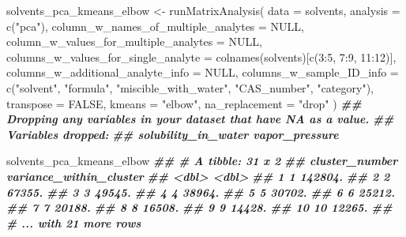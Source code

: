 \documentclass[
]{krantz}
\newenvironment{Shaded}{\begin{snugshade}}{\end{snugshade}}
\newcommand{\AttributeTok}[1]{\textcolor[rgb]{0.77,0.63,0.00}{#1}}
\newcommand{\ConstantTok}[1]{\textcolor[rgb]{0.00,0.00,0.00}{#1}}
\newcommand{\DecValTok}[1]{\textcolor[rgb]{0.00,0.00,0.81}{#1}}
\newcommand{\DocumentationTok}[1]{\textcolor[rgb]{0.56,0.35,0.01}{\textbf{\textit{#1}}}}
\newcommand{\FunctionTok}[1]{\textcolor[rgb]{0.00,0.00,0.00}{#1}}
\newcommand{\NormalTok}[1]{#1}
\newcommand{\OtherTok}[1]{\textcolor[rgb]{0.56,0.35,0.01}{#1}}
\newcommand{\SpecialCharTok}[1]{\textcolor[rgb]{0.00,0.00,0.00}{#1}}
\newcommand{\StringTok}[1]{\textcolor[rgb]{0.31,0.60,0.02}{#1}}
\begin{document}
\begin{Shaded}
\begin{Highlighting}[]
\NormalTok{solvents\_pca\_kmeans\_elbow }\OtherTok{\textless{}{-}} \FunctionTok{runMatrixAnalysis}\NormalTok{(}
  \AttributeTok{data =}\NormalTok{ solvents,}
  \AttributeTok{analysis =} \FunctionTok{c}\NormalTok{(}\StringTok{"pca"}\NormalTok{),}
  \AttributeTok{column\_w\_names\_of\_multiple\_analytes =} \ConstantTok{NULL}\NormalTok{,}
  \AttributeTok{column\_w\_values\_for\_multiple\_analytes =} \ConstantTok{NULL}\NormalTok{,}
  \AttributeTok{columns\_w\_values\_for\_single\_analyte =} \FunctionTok{colnames}\NormalTok{(solvents)[}\FunctionTok{c}\NormalTok{(}\DecValTok{3}\SpecialCharTok{:}\DecValTok{5}\NormalTok{, }\DecValTok{7}\SpecialCharTok{:}\DecValTok{9}\NormalTok{, }\DecValTok{11}\SpecialCharTok{:}\DecValTok{12}\NormalTok{)],}
  \AttributeTok{columns\_w\_additional\_analyte\_info =} \ConstantTok{NULL}\NormalTok{,}
  \AttributeTok{columns\_w\_sample\_ID\_info =} \FunctionTok{c}\NormalTok{(}\StringTok{"solvent"}\NormalTok{, }\StringTok{"formula"}\NormalTok{, }\StringTok{"miscible\_with\_water"}\NormalTok{, }\StringTok{"CAS\_number"}\NormalTok{, }\StringTok{"category"}\NormalTok{),}
  \AttributeTok{transpose =} \ConstantTok{FALSE}\NormalTok{,}
  \AttributeTok{kmeans =} \StringTok{"elbow"}\NormalTok{,}
  \AttributeTok{na\_replacement =} \StringTok{"drop"}
\NormalTok{)}
\DocumentationTok{\#\# Dropping any variables in your dataset that have NA as a value.}
\DocumentationTok{\#\# Variables dropped:}
\DocumentationTok{\#\# solubility\_in\_water vapor\_pressure}

\NormalTok{solvents\_pca\_kmeans\_elbow}
\DocumentationTok{\#\# \# A tibble: 31 x 2}
\DocumentationTok{\#\#    cluster\_number variance\_within\_cluster}
\DocumentationTok{\#\#             \textless{}dbl\textgreater{}                   \textless{}dbl\textgreater{}}
\DocumentationTok{\#\#  1              1                 142804.}
\DocumentationTok{\#\#  2              2                  67355.}
\DocumentationTok{\#\#  3              3                  49545.}
\DocumentationTok{\#\#  4              4                  38964.}
\DocumentationTok{\#\#  5              5                  30702.}
\DocumentationTok{\#\#  6              6                  25212.}
\DocumentationTok{\#\#  7              7                  20188.}
\DocumentationTok{\#\#  8              8                  16508.}
\DocumentationTok{\#\#  9              9                  14428.}
\DocumentationTok{\#\# 10             10                  12265.}
\DocumentationTok{\#\# \# ... with 21 more rows}
\end{Highlighting}
\end{Shaded}
\end{document}
